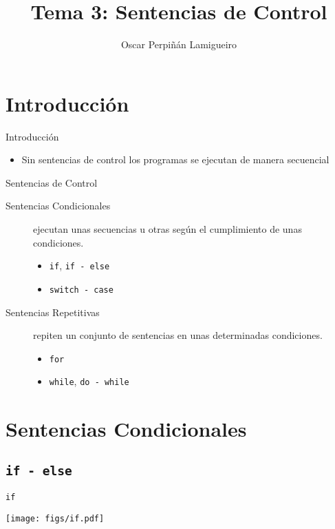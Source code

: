 \documentclass[usenames,svgnames,dvipsnames, aspectratio=169]{beamer}
\author{Oscar Perpiñán Lamigueiro}
\date{}
\title{Tema 3: Sentencias de Control}
\begin{document}
\maketitle

\section{Introducción}
\label{sec:org068ba66}
\begin{frame}[label={sec:org5f04e3b},fragile]{Introducción}
 \begin{itemize}
\item Sin sentencias de control los programas se ejecutan de manera secuencial
\end{itemize}
\begin{block}{Sentencias de Control}
\begin{description}
\item[{Sentencias Condicionales}] ejecutan unas secuencias u otras según el cumplimiento de unas condiciones.
\begin{itemize}
\item \texttt{if}, \texttt{if - else}
\item \texttt{switch - case}
\end{itemize}
\item[{Sentencias Repetitivas}] repiten un conjunto de sentencias en unas determinadas condiciones.
\begin{itemize}
\item \texttt{for}
\item \texttt{while}, \texttt{do - while}
\end{itemize}
\end{description}
\end{block}
\end{frame}
\section{Sentencias Condicionales}
\label{sec:org77dc3df}
\subsection{\texttt{if - else}}
\label{sec:org80e75e6}
\begin{frame}[label={sec:orgec1ee0c},fragile]{\texttt{if}}
 \begin{center}
\texttt{[image: figs/if.pdf]}
\end{center}
\end{frame}
\end{document}
